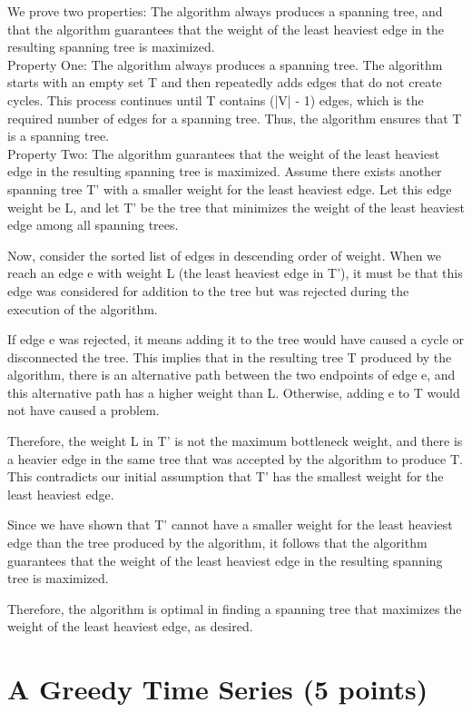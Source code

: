 \documentclass[letter,11pt]{article}
\begin{document}
We prove two properties: The algorithm always produces a spanning tree, and that the algorithm guarantees that the weight of the least heaviest edge in the resulting spanning tree is maximized. \\

Property One: The algorithm always produces a spanning tree. The algorithm starts with an empty set T and then repeatedly adds edges that do not create cycles. This process continues until T contains (|V| - 1) edges, which is the required number of edges for a spanning tree. Thus, the algorithm ensures that T is a spanning tree. \\

Property Two: The algorithm guarantees that the weight of the least heaviest edge in the resulting spanning tree is maximized. Assume there exists another spanning tree T' with a smaller weight for the least heaviest edge. Let this edge weight be L, and let T' be the tree that minimizes the weight of the least heaviest edge among all spanning trees.

Now, consider the sorted list of edges in descending order of weight. When we reach an edge e with weight L (the least heaviest edge in T'), it must be that this edge was considered for addition to the tree but was rejected during the execution of the algorithm.

If edge e was rejected, it means adding it to the tree would have caused a cycle or disconnected the tree. This implies that in the resulting tree T produced by the algorithm, there is an alternative path between the two endpoints of edge e, and this alternative path has a higher weight than L. Otherwise, adding e to T would not have caused a problem.

Therefore, the weight L in T' is not the maximum bottleneck weight, and there is a heavier edge in the same tree that was accepted by the algorithm to produce T. This contradicts our initial assumption that T' has the smallest weight for the least heaviest edge.

Since we have shown that T' cannot have a smaller weight for the least heaviest edge than the tree produced by the algorithm, it follows that the algorithm guarantees that the weight of the least heaviest edge in the resulting spanning tree is maximized.

Therefore, the algorithm is optimal in finding a spanning tree that maximizes the weight of the least heaviest edge, as desired.



\section{A Greedy Time Series (5 points)}
\end{document}
